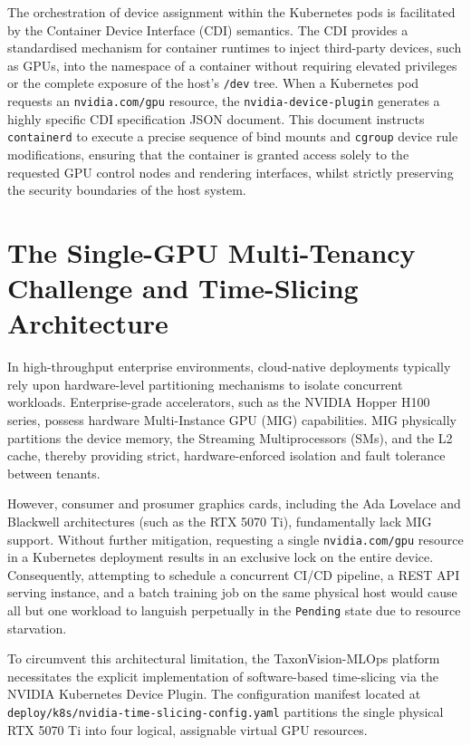 The orchestration of device assignment within the Kubernetes pods is facilitated by the Container Device Interface (CDI) semantics. The CDI provides a standardised mechanism for container runtimes to inject third-party devices, such as GPUs, into the namespace of a container without requiring elevated privileges or the complete exposure of the host's \texttt{/dev} tree. When a Kubernetes pod requests an \texttt{nvidia.com/gpu} resource, the \texttt{nvidia-device-plugin} generates a highly specific CDI specification JSON document. This document instructs \texttt{containerd} to execute a precise sequence of bind mounts and \texttt{cgroup} device rule modifications, ensuring that the container is granted access solely to the requested GPU control nodes and rendering interfaces, whilst strictly preserving the security boundaries of the host system.

\section{The Single-GPU Multi-Tenancy Challenge and Time-Slicing Architecture}
\label{sec:time_slicing_architecture}

In high-throughput enterprise environments, cloud-native deployments typically rely upon hardware-level partitioning mechanisms to isolate concurrent workloads. Enterprise-grade accelerators, such as the NVIDIA Hopper H100 series, possess hardware Multi-Instance GPU (MIG) capabilities. MIG physically partitions the device memory, the Streaming Multiprocessors (SMs), and the L2 cache, thereby providing strict, hardware-enforced isolation and fault tolerance between tenants.

However, consumer and prosumer graphics cards, including the Ada Lovelace and Blackwell architectures (such as the RTX 5070 Ti), fundamentally lack MIG support. Without further mitigation, requesting a single \texttt{nvidia.com/gpu} resource in a Kubernetes deployment results in an exclusive lock on the entire device. Consequently, attempting to schedule a concurrent CI/CD pipeline, a REST API serving instance, and a batch training job on the same physical host would cause all but one workload to languish perpetually in the \texttt{Pending} state due to resource starvation.

To circumvent this architectural limitation, the TaxonVision-MLOps platform necessitates the explicit implementation of software-based time-slicing via the NVIDIA Kubernetes Device Plugin. The configuration manifest located at \texttt{deploy/k8s/nvidia-time-slicing-config.yaml} partitions the single physical RTX 5070 Ti into four logical, assignable virtual GPU resources.

